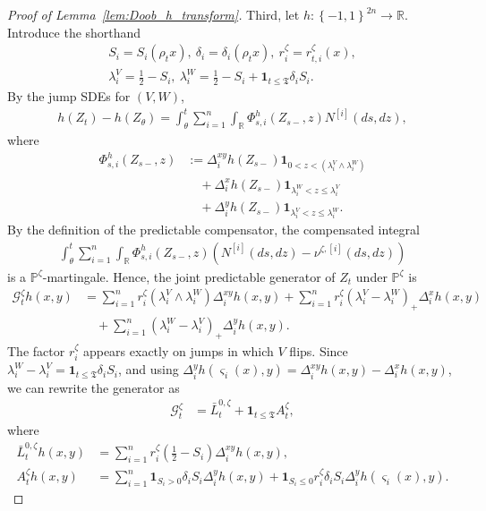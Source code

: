 \documentclass[11pt]{article}
\newcommand{\flip}{\varsigma}
\newcommand{\stopT}{{\boldsymbol{\mathfrak{T}}}}
\newcommand{\uV}{V}
\newcommand{\uW}{W}
\newcommand{\cG}{\mathcal{G}}
\newcommand{\jL}{\bar{L}}
\newcommand{\Ni}{N^{[i]}}
\theoremstyle{named}
\theoremstyle{plain}
\newcommand{\defn}{:=}
\newcommand{\real}{\ensuremath{\mathbb{R}}}
\newcommand{\Prob}{\ensuremath{{\mathbb{P}}}}
\newcommand{\parenth}[1]{\left( #1 \right)}
\newcommand{\braces}[1]{\left\{ #1 \right \}}
\begin{document}
\begin{proof}[Proof of Lemma~\ref{lem:Doob_h_transform}]
  Third, let $h: \braces{-1, 1}^{2n} \to \real$. Introduce the shorthand
  \begin{align*}
    S_i = S_i(\rho_t x),\ \delta_i = \delta_i(\rho_t x),\ r_i^{\zeta} = r^{\zeta}_{t, i}(x), \\
    \lambda_i^{V} = \frac12 - S_i,\ \lambda_i^{W} = \frac12 - S_i + \mathbf{1}_{t \leq \stopT} \delta_i S_i.
  \end{align*}
  By the jump SDEs for $(\uV, \uW)$, 
  \begin{align*}
    h(Z_t) - h(Z_\theta) = \int_\theta^t \sum_{i=1}^n \int_\real \Phi_{s, i}^{h}(Z_{s-}, z) \Ni(ds, dz),
  \end{align*}
  where 
  \begin{align*}
    \Phi_{s, i}^{h}(Z_{s-}, z) &\defn \Delta_i^{xy} h(Z_{s-}) \mathbf{1}_{0 < z < (\lambda_i^V \wedge \lambda_i^W)} \\
    &\quad + \Delta_i^x h(Z_{s-}) \mathbf{1}_{\lambda_i^W < z \leq \lambda_i^V} \\
    &\quad + \Delta_i^y h(Z_{s-}) \mathbf{1}_{\lambda_i^V < z \leq \lambda_i^W}.
  \end{align*}
  By the definition of the predictable compensator, the compensated integral
  \begin{align*}
    \int_\theta^t \sum_{i=1}^n \int_\real \Phi_{s, i}^{h}(Z_{s-}, z) \parenth{\Ni(ds, dz)  - \nu^{\zeta, [i]}(ds, dz)}
  \end{align*}
  is a $\Prob^\zeta$-martingale. Hence, the joint predictable generator of $Z_t$ under $\Prob^\zeta$ is
  \begin{align*}
    \cG_t^{\zeta} h(x, y) &= \sum_{i=1}^n r_i^{\zeta} \parenth{\lambda_i^V \wedge \lambda_i^W} \Delta_i^{xy} h (x, y) + \sum_{i=1}^n r_i^{\zeta}  \parenth{\lambda_i^V - \lambda_i^W}_+ \Delta_i^x h (x, y) \\
    &\quad + \sum_{i=1}^n \parenth{\lambda_i^W - \lambda_i^V}_+ \Delta_i^y h (x, y).
  \end{align*}
  The factor $r_i^{\zeta}$ appears exactly on jumps in which $\uV$ flips. 
  Since $\lambda_i^W - \lambda_i^V = \mathbf{1}_{t \leq \stopT} \delta_i S_i$, and using $\Delta_i^y h(\flip_i(x), y) = \Delta_i^{xy} h(x, y) - \Delta_i^x h(x, y)$, we can rewrite the generator as
  \begin{align*}
    \cG_t^{\zeta} &= \jL_t^{0, \zeta} + \mathbf{1}_{t \leq \stopT} A_t^{\zeta},
  \end{align*}
  where
  \begin{align*}
    \jL_t^{0, \zeta} h(x, y) &= \sum_{i=1}^n r_{i}^{\zeta} \parenth{\frac12 - S_i } \Delta_i^{xy} h(x, y), \\
    A_t^\zeta h(x, y) &= \sum_{i=1}^n  \mathbf{1}_{S_i > 0}  \delta_i  S_i \Delta_{i}^y h(x, y)  + \mathbf{1}_{S_i \leq 0} r_{i}^{\zeta} \delta_i  S_i  \Delta_i^y h(\flip_i(x), y).
  \end{align*}


\end{proof}
\end{document}
